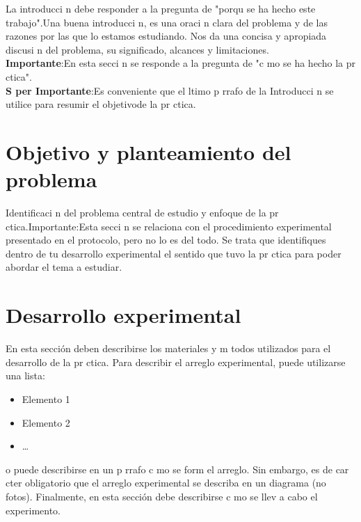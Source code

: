 \documentclass{article}
\begin{document}
 La  introducci n  debe  responder  a  la  pregunta  de  "porqu   se  ha  hecho  este  trabajo".Una  buena introducci n,  es  una  oraci n  clara  del  problema  y  de  las  razones  por  las  que  lo  estamos estudiando.  Nos  da  una  concisa  y  apropiada  discusi n  del  problema,  su  significado,  alcances  y limitaciones.\\\textbf{Importante}:En esta secci n se responde a la pregunta de "c mo se ha hecho la pr ctica".\\\textbf{S per Importante}:Es conveniente que el  ltimo p rrafo de la Introducci n se utilice para resumir el objetivode la pr ctica.

\section{Objetivo y planteamiento del problema}

Identificaci n del problema central de estudio y enfoque de la pr ctica.Importante:Esta  secci n  se  relaciona  con  el  procedimiento  experimental  presentado  en  el protocolo, pero no lo es del todo. Se trata que identifiques dentro de tu desarrollo experimental el sentido que tuvo la pr ctica para poder abordar el tema a estudiar.

\section{Desarrollo experimental}

En esta secci\'on deben describirse los materiales y m todos utilizados para el desarrollo de la pr ctica. Para describir el arreglo experimental, puede utilizarse una lista:
\begin{itemize}
    \item Elemento 1
    \item Elemento 2
    \item \ldots
\end{itemize}
o puede describirse en un p rrafo c mo se form  el arreglo. Sin embargo, es de car cter obligatorio que el arreglo experimental se describa en un diagrama (no fotos).
Finalmente, en esta secci\'on debe describirse c mo se llev  a cabo el experimento.
\end{document}
